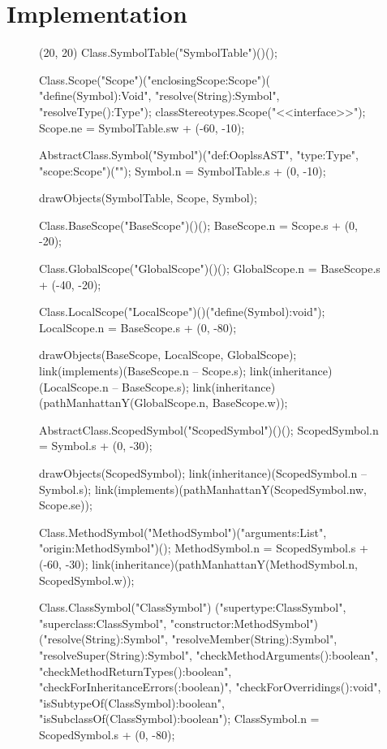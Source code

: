 \chapter{Implementation}

\begin{figure}[H]
	\centering
	\begin{emp}[classdiag](20, 20)
	Class.SymbolTable("SymbolTable")()();

	Class.Scope("Scope")("enclosingScope:Scope")( "define(Symbol):Void", 
			"resolve(String):Symbol", "resolveType():Type");
	classStereotypes.Scope("<<interface>>");
	Scope.ne = SymbolTable.sw + (-60, -10);

	AbstractClass.Symbol("Symbol")("def:OoplssAST", "type:Type", "scope:Scope")("");
	Symbol.n = SymbolTable.s + (0, -10);

	drawObjects(SymbolTable, Scope, Symbol);

	Class.BaseScope("BaseScope")()();
	BaseScope.n = Scope.s + (0, -20);

	Class.GlobalScope("GlobalScope")()();
	GlobalScope.n = BaseScope.s + (-40, -20);

	Class.LocalScope("LocalScope")()("define(Symbol):void");
	LocalScope.n = BaseScope.s + (0, -80);

	drawObjects(BaseScope, LocalScope, GlobalScope);
	link(implements)(BaseScope.n -- Scope.s);
	link(inheritance)(LocalScope.n -- BaseScope.s);
	link(inheritance)(pathManhattanY(GlobalScope.n, BaseScope.w));

	AbstractClass.ScopedSymbol("ScopedSymbol")()();
	ScopedSymbol.n  = Symbol.s + (0, -30);

	drawObjects(ScopedSymbol);
	link(inheritance)(ScopedSymbol.n -- Symbol.s);
	link(implements)(pathManhattanY(ScopedSymbol.nw, Scope.se));

	Class.MethodSymbol("MethodSymbol")("arguments:List", "origin:MethodSymbol")();
	MethodSymbol.n = ScopedSymbol.s + (-60, -30);
	link(inheritance)(pathManhattanY(MethodSymbol.n, ScopedSymbol.w));

	Class.ClassSymbol("ClassSymbol")
		("supertype:ClassSymbol", "superclass:ClassSymbol", "constructor:MethodSymbol")
		("resolve(String):Symbol", "resolveMember(String):Symbol",
		"resolveSuper(String):Symbol", 
		"checkMethodArguments():boolean", "checkMethodReturnTypes():boolean",
		"checkForInheritanceErrors(:boolean)", "checkForOverridings():void",
		"isSubtypeOf(ClassSymbol):boolean", "isSubclassOf(ClassSymbol):boolean");
	ClassSymbol.n = ScopedSymbol.s + (0, -80);


\end{emp}
\end{figure}
